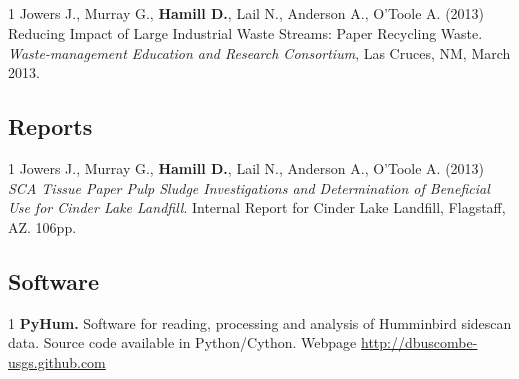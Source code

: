 \documentclass[margin,line]{resume}
\begin{document}
\begin{resume}
\begin{footnotesize}
\begin{list1}
	\end{list1}
	
	\subsection{}
	\begin{list1}
		
	\item[1] Jowers J., Murray G., {\bf Hamill D.}, Lail N., Anderson A., O'Toole A. (2013) Reducing Impact of Large Industrial Waste Streams: Paper Recycling Waste. {\sl Waste-management Education and Research Consortium}, Las Cruces, NM, March 2013.\\
	
	\end{list1}
	
	        \end{footnotesize}

	\subsection{\mysidestyle Reports}
        \begin{footnotesize}
	\begin{list1}
		
	\item[1] Jowers J., Murray G., {\bf Hamill D.}, Lail N., Anderson A., O'Toole A. (2013) {\sl SCA Tissue Paper Pulp Sludge Investigations and Determination of Beneficial Use for Cinder Lake Landfill}. Internal Report for Cinder Lake Landfill, Flagstaff, AZ. 106pp.

	\end{list1}
        \end{footnotesize}

	\subsection{\mysidestyle Software}

        \begin{footnotesize}
	\begin{list1}
	 
	\item[1] {\bf PyHum.} Software for reading, processing and analysis of Humminbird sidescan data. Source code available in Python/Cython. Webpage \url{http://dbuscombe-usgs.github.com}\\


\end{list1}
\end{footnotesize}
\end{resume}
\end{document}
